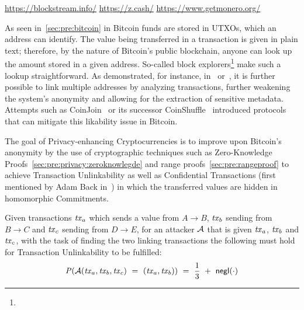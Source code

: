 \urldef\urlblockexp\url{https://blockstream.info/}
\urldef\urlzcash\url{https://z.cash/}
\urldef\urlmonero\url{https://www.getmonero.org/}

As seen in~\cref{sec:pre:bitcoin} in Bitcoin funds are stored in UTXOs, which an address can identify.
The value being transferred in a transaction is given in plain text; therefore, by the nature of Bitcoin’s public blockchain, anyone can look up the amount stored in a given address.
So-called block explorers\footnote{\urlblockexp} make such a lookup straightforward.
As demonstrated, for instance, in~\cite{barber2012bitter} or~\cite{reid2013analysis}, it is further possible to link multiple addresses by analyzing transactions, further weakening the system's anonymity and allowing for the extraction of sensitive metadata.
Attempts such as CoinJoin~\cite{maxwell2013coinjoin} or its successor CoinShuffle~\cite{ruffing2014coinshuffle}  introduced protocols that can mitigate this likability issue in Bitcoin.

The goal of Privacy-enhancing Cryptocurrencies is to improve upon Bitcoin's anonymity by the use of cryptographic techniques such as Zero-Knowledge Proofs~\cref{sec:pre:privacy:zeroknowlegde} and range proofs~\cref{sec:pre:rangeproof}  to achieve Transaction Unlinkability as well as Confidential Transactions (first mentioned by Adam Back in~\cite{back2013confidentialtx}) in which the transferred values are hidden in homomorphic Commitments.

\begin{definition} \label{def:pre:privacy:tx-unlink}
    Given transactions $\mathit{tx}_a$ which sends a value from $A \rightarrow B$, $\mathit{tx}_b$ sending from $B \rightarrow C$ and $\mathit{tx}_c$ sending from $D \rightarrow E$,  for an attacker $\mathcal{A}$ that is given $\mathit{tx}_a$, $\mathit{tx}_b$ and $\mathit{tx}_c$, with the task of finding the two linking transactions the following must hold for Transaction Unlinkability to be fulfilled:
    \[ \mathit{P}(\mathcal{A}(\mathit{tx}_a, \mathit{tx}_b, \mathit{tx}_c) ~=~ (\mathit{tx}_a, \mathit{tx}_b)) ~=~ \frac{1}{3} ~+~ \mathsf{negl}(\cdot)\]
\end{definition}

